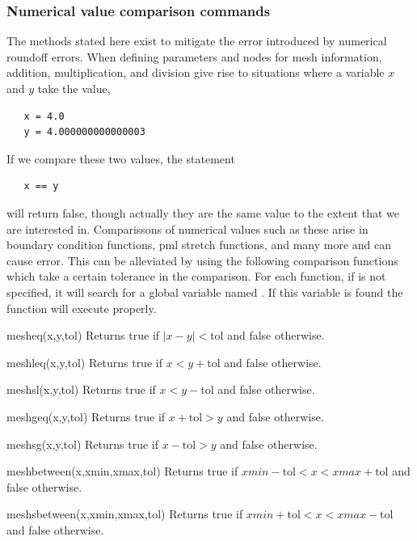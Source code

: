 \subsubsection{Numerical value comparison commands}
The methods stated here exist to mitigate the error 
introduced by numerical roundoff errors. When defining
parameters and nodes for mesh information, addition,
multiplication, and division give rise to situations
where a variable $x$ and $y$ take the value,
\begin{verbatim}
   x = 4.0 
   y = 4.000000000000003 
\end{verbatim}
If we compare these two values, the statement
\begin{verbatim}
   x == y
\end{verbatim}
will return false, though actually they are the same value
to the extent that we are interested in. Comparissons of
numerical values such as these arise in boundary condition
functions, pml stretch functions, and many more and can cause
error. This can be alleviated by using the following comparison
functions which take a certain tolerance in the comparison.
For each function, if  is not specified, it will search
for a global variable named . If this variable is
found the function will execute properly. 
\begin{codelist}
  \item[mesheq(x,y,tol)] Returns true if $|x-y| < \text{tol}$ and 
  false otherwise. 
  \item[meshleq(x,y,tol)] Returns true if $ x < y + \text{tol}$ and 
  false otherwise.
  \item[meshsl(x,y,tol)] Returns true if $ x < y - \text{tol}$ and 
  false otherwise.
  \item[meshgeq(x,y,tol)] Returns true if $ x + \text{tol} > y$ and
  false otherwise.
  \item[meshsg(x,y,tol)] Returns true if $ x - \text{tol} > y$ and
  false otherwise.
  \item[meshbetween(x,xmin,xmax,tol)] Returns true if 
  $ xmin - \text{tol} < x < xmax + \text{tol}$ and false otherwise.
  \item[meshsbetween(x,xmin,xmax,tol)] Returns true if 
  $ xmin + \text{tol} < x < xmax - \text{tol}$ and false otherwise.
\end{codelist}

